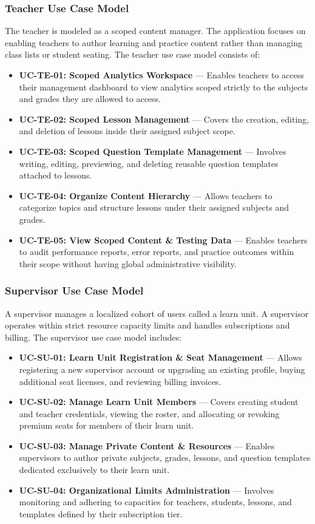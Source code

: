 \subsubsection{Teacher Use Case Model}

The teacher is modeled as a scoped content manager. The application focuses on enabling teachers to author learning and practice content rather than managing class lists or student seating. The teacher use case model consists of:
\begin{itemize}
  \item \textbf{UC-TE-01: Scoped Analytics Workspace} --- Enables teachers to access their management dashboard to view analytics scoped strictly to the subjects and grades they are allowed to access.
  \item \textbf{UC-TE-02: Scoped Lesson Management} --- Covers the creation, editing, and deletion of lessons inside their assigned subject scope.
  \item \textbf{UC-TE-03: Scoped Question Template Management} --- Involves writing, editing, previewing, and deleting reusable question templates attached to lessons.
  \item \textbf{UC-TE-04: Organize Content Hierarchy} --- Allows teachers to categorize topics and structure lessons under their assigned subjects and grades.
  \item \textbf{UC-TE-05: View Scoped Content \& Testing Data} --- Enables teachers to audit performance reports, error reports, and practice outcomes within their scope without having global administrative visibility.
\end{itemize}

\subsubsection{Supervisor Use Case Model}

A supervisor manages a localized cohort of users called a learn unit. A supervisor operates within strict resource capacity limits and handles subscriptions and billing. The supervisor use case model includes:
\begin{itemize}
  \item \textbf{UC-SU-01: Learn Unit Registration \& Seat Management} --- Allows registering a new supervisor account or upgrading an existing profile, buying additional seat licenses, and reviewing billing invoices.
  \item \textbf{UC-SU-02: Manage Learn Unit Members} --- Covers creating student and teacher credentials, viewing the roster, and allocating or revoking premium seats for members of their learn unit.
  \item \textbf{UC-SU-03: Manage Private Content \& Resources} --- Enables supervisors to author private subjects, grades, lessons, and question templates dedicated exclusively to their learn unit.
  \item \textbf{UC-SU-04: Organizational Limits Administration} --- Involves monitoring and adhering to capacities for teachers, students, lessons, and templates defined by their subscription tier.
\end{itemize}

